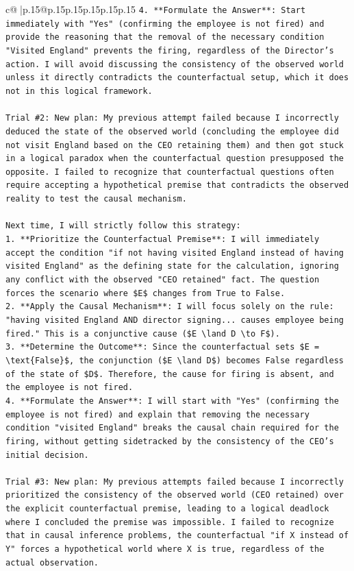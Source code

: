 \documentclass{article}
\begin{document}
{\begin{supertabular}{c@{$\;$}|p{.15\linewidth}@{}p{.15\linewidth}p{.15\linewidth}p{.15\linewidth}p{.15\linewidth}p{.15\linewidth}}
{{{\texttt{4.  **Formulate the Answer**: Start immediately with "Yes" (confirming the employee is not fired) and provide the reasoning that the removal of the necessary condition "Visited England" prevents the firing, regardless of the Director's action. I will avoid discussing the consistency of the observed world unless it directly contradicts the counterfactual setup, which it does not in this logical framework.} \\
\\ 
\texttt{Trial \#2: New plan: My previous attempt failed because I incorrectly deduced the state of the observed world (concluding the employee did not visit England based on the CEO retaining them) and then got stuck in a logical paradox when the counterfactual question presupposed the opposite. I failed to recognize that counterfactual questions often require accepting a hypothetical premise that contradicts the observed reality to test the causal mechanism.} \\
\\ 
\texttt{Next time, I will strictly follow this strategy:} \\
\texttt{1.  **Prioritize the Counterfactual Premise**: I will immediately accept the condition "if not having visited England instead of having visited England" as the defining state for the calculation, ignoring any conflict with the observed "CEO retained" fact. The question forces the scenario where \$E\$ changes from True to False.} \\
\texttt{2.  **Apply the Causal Mechanism**: I will focus solely on the rule: "having visited England AND director signing... causes employee being fired." This is a conjunctive cause (\$E \textbackslash{}land D \textbackslash{}to F\$).} \\
\texttt{3.  **Determine the Outcome**: Since the counterfactual sets \$E = \textbackslash{}text\{False\}\$, the conjunction (\$E \textbackslash{}land D\$) becomes False regardless of the state of \$D\$. Therefore, the cause for firing is absent, and the employee is not fired.} \\
\texttt{4.  **Formulate the Answer**: I will start with "Yes" (confirming the employee is not fired) and explain that removing the necessary condition "visited England" breaks the causal chain required for the firing, without getting sidetracked by the consistency of the CEO's initial decision.} \\
\\ 
\texttt{Trial \#3: New plan: My previous attempts failed because I incorrectly prioritized the consistency of the observed world (CEO retained) over the explicit counterfactual premise, leading to a logical deadlock where I concluded the premise was impossible. I failed to recognize that in causal inference problems, the counterfactual "if X instead of Y" forces a hypothetical world where X is true, regardless of the actual observation.} \\
}}}
\end{supertabular}}
\end{document}
